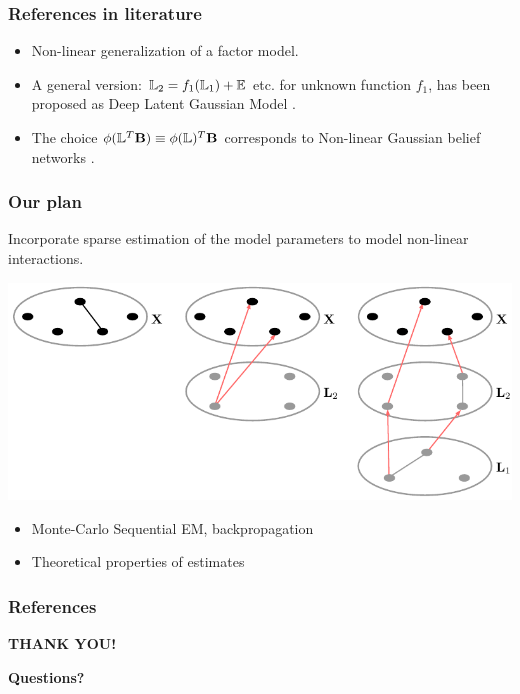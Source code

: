 \documentclass[10pt]{beamer}
\theoremstyle{definition}
\newcommand{\colubf}{\color{UniBlue}\bf}
\begin{document}
\begin{frame}
\frametitle{References in literature}

\begin{itemize}
\item Non-linear generalization of a factor model.

\vspace{1em}
\item A general version: ${\mathbb{L}}_2 = f_1({\mathbb{L}}_1) + {\mathbb{E}}$ etc. for unknown function $f_1$, has been proposed as Deep Latent Gaussian Model \citep{RezendeEtal14}.

\vspace{1em}
\item The choice $\phi({\mathbb{L}}^T {\mathbf{B}}) \equiv \phi({\mathbb{L}})^T {\mathbf{B}}$ corresponds to Non-linear Gaussian belief networks \citep{FreyHinton99}.

\end{itemize}
\end{frame}

\begin{frame}
\frametitle{Our plan}

Incorporate sparse estimation of the model parameters to model non-linear interactions.

\begin{center}
\includegraphics[width=.7\textwidth]{../MS/latentinteractions}
\end{center}

\begin{itemize}
\item Monte-Carlo Sequential EM, backpropagation
\item Theoretical properties of estimates
\end{itemize}

\end{frame}

\begin{frame}
\frametitle{References}
{\scriptsize


}
\end{frame}


\begin{frame}
\centering
{\huge\textcolor{UniBlue}{\textbf{THANK YOU!}}}\\

\vspace{2em}

\vspace{1em}
{\colubf Questions?}
\end{frame}
\end{document}
